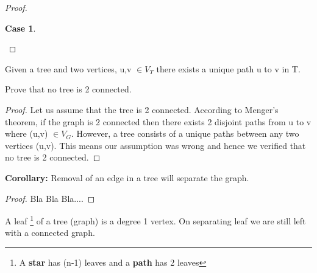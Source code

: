 \documentclass{article}
\newtheorem{case}{Case}
\begin{document}
\begin{proof}
\begin{case}
\begin{center}

\end{center}

    \end{case}
\end{proof}

\begin{theorem}
    Given a tree and two vertices, u,v $\in V_{T}$ there exists a unique path u to v in T.
\end{theorem}

\begin{corollary}
    Prove that no tree is 2 connected.
    \begin{proof}
        Let us assume that the tree is 2 connected. According to Menger's theorem, if the graph is 2 connected then there exists 2 disjoint paths from u to v where (u,v) $\in V_G$. However, a tree consists of a unique paths between any two vertices (u,v). This means our assumption was wrong and hence we verified that no tree is 2 connected.
    \end{proof}
\end{corollary}

\begin{text}
{\textbf {Corollary: }Removal of an edge in a tree will separate the graph.}
    \begin{proof}
        Bla Bla Bla....       
    \end{proof}
\end{text}

\begin{definition}
A leaf \footnote{A \textbf{star} has (n-1) leaves and a \textbf{path} has 2 leaves} of a tree (graph) is a degree 1 vertex. On separating leaf we are still left with a connected graph.
\end{definition}
\end{document}
